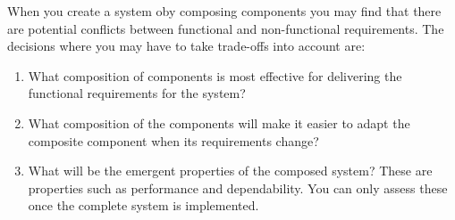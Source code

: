 \documentclass{article}
\begin{document}
When you create a system oby composing components you may find that there are potential conflicts between functional and non-functional requirements.  The decisions where you may have to take trade-offs into account are:
\begin{enumerate}
\item What composition of components is most effective for delivering the functional requirements for the system?
\item What composition of the components will make it easier to adapt the composite component when its requirements change?
\item What will be the emergent properties of the composed system?  These are properties such as performance and dependability.  You can only assess these once the complete system is implemented.
\end{enumerate}
\end{document}
